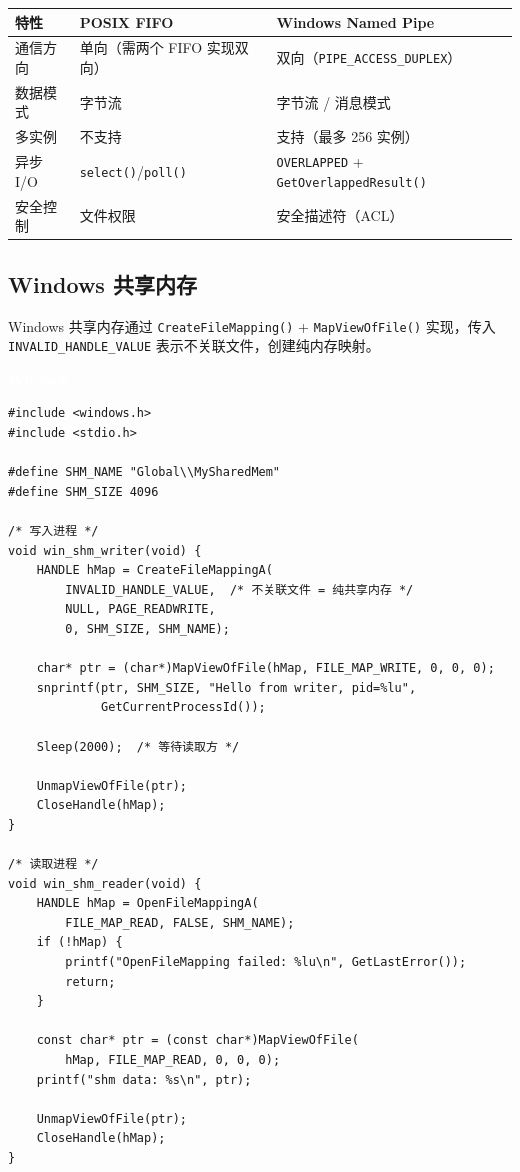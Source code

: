 \documentclass[12pt,a4paper,fontset=fandol]{ctexbook}
\newcommand{\Fn}[1]{\texttt{#1()}}
\newcommand{\Tp}[1]{\texttt{#1}}
\newcommand{\winlabel}{%
  \noindent\begin{tcolorbox}[sharp corners,colback=winheadbg,colframe=winheadbg,
    left=6pt,right=6pt,top=2pt,bottom=2pt,boxrule=0pt]
  \textcolor{white}{\small\bfseries\sffamily Winsock}\end{tcolorbox}%
}
\begin{document}
\begin{compare}[title=POSIX FIFO vs Windows Named Pipe]
\begin{tabularx}{\textwidth}{l>{\raggedright\arraybackslash}X>{\raggedright\arraybackslash}X}
\toprule
\textbf{特性} & \textbf{POSIX FIFO} & \textbf{Windows Named Pipe} \\
\midrule
通信方向 & 单向（需两个 FIFO 实现双向） & 双向（\Tp{PIPE\_ACCESS\_DUPLEX}） \\
数据模式 & 字节流 & 字节流 / 消息模式 \\
多实例 & 不支持 & 支持（最多 256 实例） \\
异步 I/O & \Fn{select}/\allowbreak{}\Fn{poll} & \Tp{OVERLAPPED} + \Fn{GetOverlappedResult} \\
安全控制 & 文件权限 & 安全描述符（ACL） \\
\bottomrule
\end{tabularx}
\end{compare}

\subsection{Windows 共享内存}

Windows 共享内存通过 \Fn{CreateFileMapping} + \Fn{MapViewOfFile} 实现，传入 \Tp{INVALID\_HANDLE\_VALUE} 表示不关联文件，创建纯内存映射。

\winlabel
\begin{lstlisting}[style=cstyle]
#include <windows.h>
#include <stdio.h>

#define SHM_NAME "Global\\MySharedMem"
#define SHM_SIZE 4096

/* 写入进程 */
void win_shm_writer(void) {
    HANDLE hMap = CreateFileMappingA(
        INVALID_HANDLE_VALUE,  /* 不关联文件 = 纯共享内存 */
        NULL, PAGE_READWRITE,
        0, SHM_SIZE, SHM_NAME);

    char* ptr = (char*)MapViewOfFile(hMap, FILE_MAP_WRITE, 0, 0, 0);
    snprintf(ptr, SHM_SIZE, "Hello from writer, pid=%lu",
             GetCurrentProcessId());

    Sleep(2000);  /* 等待读取方 */

    UnmapViewOfFile(ptr);
    CloseHandle(hMap);
}

/* 读取进程 */
void win_shm_reader(void) {
    HANDLE hMap = OpenFileMappingA(
        FILE_MAP_READ, FALSE, SHM_NAME);
    if (!hMap) {
        printf("OpenFileMapping failed: %lu\n", GetLastError());
        return;
    }

    const char* ptr = (const char*)MapViewOfFile(
        hMap, FILE_MAP_READ, 0, 0, 0);
    printf("shm data: %s\n", ptr);

    UnmapViewOfFile(ptr);
    CloseHandle(hMap);
}
\end{lstlisting}
\end{document}
